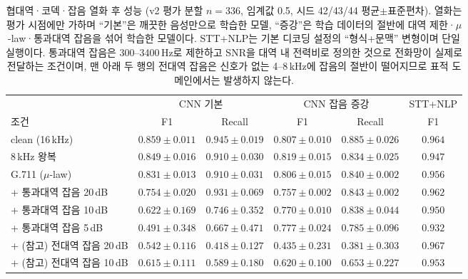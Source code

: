 \documentclass[10pt,twocolumn]{article}
\begin{document}
\begin{table}[!t]
\centering
\caption{협대역·코덱·잡음 열화 후 성능 (v2 평가 분할 $n=336$, 임계값 0.5, 시드 42/43/44
평균$\pm$표준편차). 열화는 평가 시점에만 가하며 ``기본''은 깨끗한 음성만으로 학습한 모델,
``증강''은 학습 데이터의 절반에 대역 제한·$\mu$-law·통과대역 잡음을 섞어 학습한 모델이다.
STT+NLP는 기본 디코딩 설정의 ``형식+문맥'' 변형이며 단일 실행이다. 통과대역 잡음은
300--3400\,Hz로 제한하고 SNR을 대역 내 전력비로 정의한 것으로 전화망이 실제로 전달하는
조건이며, 맨 아래 두 행의 전대역 잡음은 신호가 없는 4--8\,kHz에 잡음의 절반이 떨어지므로 표적
도메인에서는 발생하지 않는다.}
\label{tab:degrade}
\small
\setlength{\tabcolsep}{6pt}
\begin{tabular}{lcc|cc|c}
\toprule
 & \multicolumn{2}{c|}{CNN 기본} & \multicolumn{2}{c|}{CNN 잡음 증강} & STT+NLP \\
조건 & F1 & Recall & F1 & Recall & F1 \\
\midrule
clean (16\,kHz) & $0.859\pm0.011$ & $0.945\pm0.019$ & $0.807\pm0.010$ & $0.885\pm0.026$ & $0.964$ \\
8\,kHz 왕복 & $0.849\pm0.016$ & $0.910\pm0.030$ & $0.819\pm0.015$ & $0.834\pm0.025$ & $0.947$ \\
G.711 ($\mu$-law) & $0.831\pm0.013$ & $0.910\pm0.031$ & $0.806\pm0.015$ & $0.840\pm0.002$ & $0.956$ \\
\midrule
\;+ 통과대역 잡음 20\,dB & $0.754\pm0.020$ & $0.931\pm0.069$ & $0.757\pm0.002$ & $0.843\pm0.002$ & $0.962$ \\
\;+ 통과대역 잡음 10\,dB & $0.622\pm0.169$ & $0.746\pm0.352$ & $\mathbf{0.770\pm0.010}$ & $0.838\pm0.044$ & $0.950$ \\
\;+ 통과대역 잡음 5\,dB & $0.491\pm0.348$ & $0.667\pm0.471$ & $\mathbf{0.777\pm0.024}$ & $0.785\pm0.096$ & $0.932$ \\
\midrule
\;+ (참고) 전대역 잡음 20\,dB & $0.542\pm0.116$ & $0.418\pm0.127$ & $0.435\pm0.231$ & $0.381\pm0.303$ & $0.967$ \\
\;+ (참고) 전대역 잡음 10\,dB & $0.615\pm0.111$ & $0.589\pm0.180$ & $0.620\pm0.100$ & $0.653\pm0.227$ & $0.953$ \\
\bottomrule
\end{tabular}
\end{table}
\end{document}
